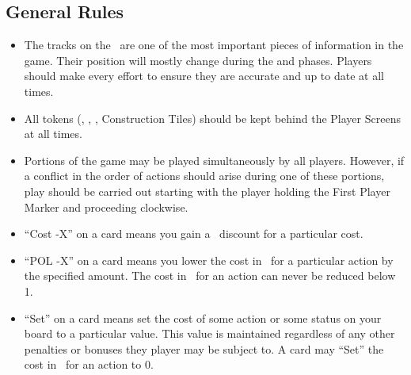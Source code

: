 \documentclass[10pt,twocolumn]{article}
\begin{document}
\subsection{General Rules}
\begin{itemize}
\item The tracks on the \psb\ are one of the most important pieces of information in the game. Their position will mostly change during the  and  phases. Players should make every effort to ensure they are accurate and up to date at all times.

\item All tokens (\goods, \money, \vps, Construction Tiles) should be kept behind the Player Screens at all times.
\iftoggle{original-rules}{
\item A player may not have fewer than 0 \vps.
}{
\item A player may not have less than 0 \vps.
}
\item Portions of the game may be played simultaneously by all players. However, if a conflict in the order of actions should arise during one of these portions, play should be carried out starting with the player holding the First Player Marker and proceeding clockwise.

\iftoggle{original-rules}{
\item ``R'' marked on a card means ``Produce the following \goodss\ each round during the \myPhase{Production \& Maintain Workers} phase''. The effect of these abilities should be reflected on the \psb\ of the owning player.
}{
\item The small gear icon next to an ability on a card should be read as ``Produce the following \goodss\ each round during the \myPhase{Production \& Maintain Workers} phase''. The effect of these abilities should be reflected on the \psb\ of the owning player.
}
\item ``Cost -X'' on a card means you gain a \goodss\ discount for a particular cost.

\item ``POL -X'' on a card means you lower the cost in \polfs\ for a particular action by the specified amount. The cost in \polfs\ for an action can never be reduced below 1.

\item ``Set'' on a card means set the cost of some action or some status on your board to a particular value. This value is maintained regardless of any other penalties or bonuses they player may be subject to. A card may ``Set'' the cost in \polfs\ for an action to 0.


\end{itemize}
\end{document}
